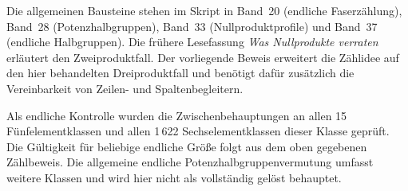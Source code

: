 \documentclass[a4paper,11pt]{article}
\theoremstyle{remark}
\begin{document}
Die allgemeinen Bausteine stehen im Skript in Band~20
(endliche Faserzählung), Band~28 (Potenzhalbgruppen), Band~33
(Nullproduktprofile) und Band~37 (endliche Halbgruppen). Die frühere
Lesefassung \emph{Was Nullprodukte verraten} erläutert den
Zweiproduktfall. Der vorliegende Beweis erweitert die Zählidee auf den
hier behandelten Dreiproduktfall und benötigt dafür zusätzlich die
Vereinbarkeit von Zeilen- und Spaltenbegleitern.

Als endliche Kontrolle wurden die Zwischenbehauptungen an allen
15 Fünfelementklassen und allen 1\,622 Sechselementklassen dieser Klasse
geprüft. Die Gültigkeit für beliebige endliche Größe folgt aus dem oben
gegebenen Zählbeweis. Die allgemeine endliche Potenzhalbgruppenvermutung
umfasst weitere Klassen und wird hier nicht als vollständig gelöst
behauptet.
\end{document}
